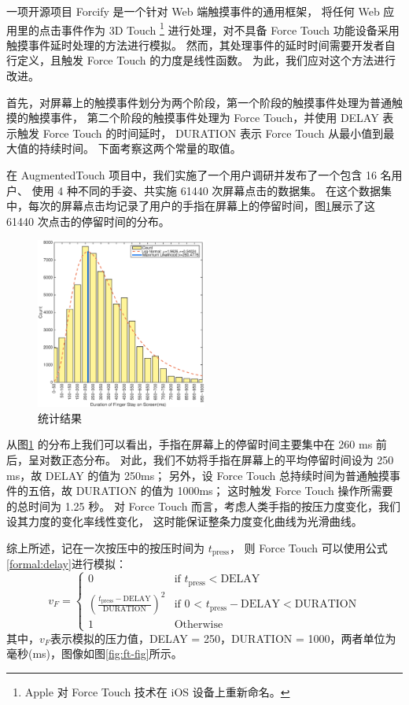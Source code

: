 一项开源项目 Forcify \cite{Huxpro:2016ua} 是一个针对 Web 端触摸事件的通用框架，
将任何 Web 应用里的点击事件作为 3D Touch
\footnote{Apple 对 Force Touch 技术在 iOS 设备上重新命名。}
进行处理，对不具备 Force Touch 功能设备采用触摸事件延时处理的方法进行模拟。
然而，其处理事件的延时时间需要开发者自行定义，且触发 Force Touch 的力度是线性函数。
为此，我们应对这个方法进行改进。

首先，对屏幕上的触摸事件划分为两个阶段，第一个阶段的触摸事件处理为普通触摸的触摸事件，
第二个阶段的触摸事件处理为 Force Touch，并使用 DELAY 表示触发 Force Touch 的时间延时，
DURATION 表示 Force Touch 从最小值到最大值的持续时间。
下面考察这两个常量的取值。

在 AugmentedTouch \cite{Changkun:2016} 项目中，我们实施了一个用户调研并发布了一个包含 16 名用户、
使用 4 种不同的手姿、共实施 61440 次屏幕点击的数据集。
在这个数据集中，每次的屏幕点击均记录了用户的手指在屏幕上的停留时间，图\ref{fig:result}展示了这 61440 次点击的停留时间的分布。

\begin{figure}[H]
    \kaishu
    \centering
    \includegraphics[width=0.5\textwidth]{figures/count-result}
    \caption{\kaishu 统计结果}
    \label{fig:result}
\end{figure}

从图\ref{fig:result} 的分布上我们可以看出，手指在屏幕上的停留时间主要集中在 260 ms 前后，呈对数正态分布。
对此，我们不妨将手指在屏幕上的平均停留时间设为 250 ms，故 DELAY 的值为 250ms；
另外，设 Force Touch 总持续时间为普通触摸事件的五倍，故 DURATION 的值为 1000ms；
这时触发 Force Touch 操作所需要的总时间为 1.25 秒。
对 Force Touch 而言，考虑人类手指的按压力度变化，我们设其力度的变化率线性变化，
这时能保证整条力度变化曲线为光滑曲线。

综上所述，记在一次按压中的按压时间为 $t_{\text{press}}$，
则 Force Touch 可以使用公式\ref{formal:delay}进行模拟：
\begin{equation}
v_{F} =
    \begin{cases}
        0    & \mbox{if $t_{\text{press}} < \text{DELAY}$} \\
        \left(\frac{t_{\text{press}}-\text{DELAY}}{\text{DURATION}}\right)^{2}
             & \mbox{if 0 < $t_{\text{press}}-\text{DELAY} < \text{DURATION}$} \\
        1    & \mbox{Otherwise}
    \end{cases}
\label{formal:delay}
\end{equation}
其中，$v_{F}$表示模拟的压力值，DELAY = 250，DURATION = 1000，两者单位为毫秒(ms)，图像如图\ref{fig:ft-fig}所示。

